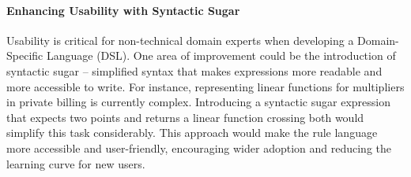 \paragraph{Enhancing Usability with Syntactic Sugar}
Usability is critical for non-technical domain experts when developing a Domain-Specific Language (DSL).
One area of improvement could be the introduction of syntactic sugar –
simplified syntax that makes expressions more readable and more accessible to write.
For instance, representing linear functions for multipliers in private billing is currently complex.
Introducing a syntactic sugar expression that expects two points
and returns a linear function crossing both would simplify this task considerably.
This approach would make the rule language more accessible and user-friendly,
encouraging wider adoption and reducing the learning curve for new users.
